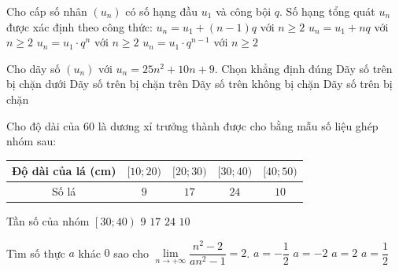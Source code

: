 \begin{ex}%
	Cho cấp số nhân $(u_n)$ có số hạng đầu $u_1$ và công bội $q$. Số hạng tổng quát $u_n$ được xác định theo công thức:
	\choice
	{$u_n=u_1+(n-1)q$ với $n \ge 2$}
	{$u_n=u_1+nq$ với $n \ge 2$}
	{$u_n=u_1 \cdot q^n$ với $n \ge 2$}
	{\True $u_n=u_1 \cdot q^{n-1}$ với $n \ge 2$}
\end{ex}

\begin{ex}%
	Cho dãy số $(u_n)$ với $u_n=25n^2+10n+9$. Chọn khẳng định đúng
	\choice
	{\True Dãy số trên bị chặn dưới}
	{Dãy số trên bị chặn trên}
	{Dãy số trên không bị chặn}
	{Dãy số trên bị chặn}
\end{ex}

\begin{ex}%
	Cho độ dài của $60$ là dương xỉ trưởng thành được cho bằng mẫu số liệu ghép nhóm sau:
	\begin{center}
		\begin{tabular}{|c|c|c|c|c|}
		\hline
		Độ dài của lá (cm) & $[10;20)$ & $[20;30)$ & $[30;40)$ & $[40;50)$ \\
		\hline
		Số lá & $9$ & $17$ & $24$ & $10$ \\
		\hline
		\end{tabular}
	\end{center}
	Tần số của nhóm $\left[30;40\right)$
	\choice
	{$9$}
	{$17$}
	{\True $24$}
	{$10$}
	\loigiai{
	Tần số của nhóm $\left[30;40\right)$ là 24.
	}
\end{ex}

\begin{ex}%
		Tìm số thực $a$ khác $0$ sao cho $\lim\limits_{n \to +\infty}{\dfrac{n^2-2}{an^2-1}}=2$. 
		\choice
		{$a=-\dfrac{1}{2}$}
		{$a=-2$}
		{$a=2$}
		{\True $a=\dfrac{1}{2}$}
\end{ex}

